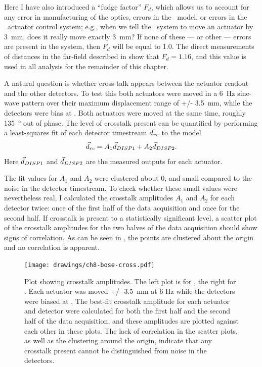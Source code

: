 Here I have also introduced a ``fudge factor'' $F_d$, which allows us to account for any error in manufacturing of the optics, errors in the \ZEMAX\ model, or errors in the \BOSE\ actuator control system; e.g., when we tell the \BOSE\ system to move an actuator by \SI{3}{\mm}, does it really move exactly \SI{3}{\mm}?
If none of these --- or other --- errors are present in the system, then $F_d$ will be equal to 1.0.
The direct measurements of distances in the far-field described in  show that $F_d = 1.16$, and this value is used in all analysis for the remainder of this chapter.


A natural question is whether cross-talk appears between the actuator readout and the other detectors.
To test this both actuators were moved in a \SI{6}{\Hz} sine-wave pattern over their maximum displacement range of +/- 3.5~mm, while the detectors were bias at \SOC.
Both actuators were moved at the same time, roughly \SI{135}{\degree} out of phase.
The level of crosstalk present can be quantified by performing a least-squares fit of each detector timestream $\vec{d}_{rc}$ to the model
\begin{equation}
	 \vec{d}_{rc} = A_1 \vec{d}_{{\small DISP{1}}} + A_2 \vec{d}_{{\small DISP{2}}}.
\end{equation}
Here $\vec{d}_{{\small DISP{1}}}$ and $\vec{d}_{{\small DISP{2}}}$ are the measured outputs for each actuator.

The fit values for $A_1$ and $A_2$ were clustered about 0, and small compared to the noise in the detector timestream.
To check whether these small values were nevertheless real, I calculated the crosstalk amplitudes $A_1$ and $A_2$ for each detector twice: once of the first half of the data acquisition and once for the second half.
If crosstalk is present to a statistically significant level, a scatter plot of the crosstalk amplitudes for the two halves of the data acquisition should show signs of correlation.
As can be seen in , the points are clustered about the origin and no correlation is apparent.

\begin{figure}[th]
\centering
\texttt{[image: drawings/ch8-bose-cross.pdf]}
\caption{
Plot showing crosstalk amplitudes.
The left plot is for , the right for .
Each actuator was moved +/- \SI{3.5}{\mm} at 6 Hz while the detectors were biased at \SOC.
The best-fit crosstalk amplitude for each actuator and detector were calculated for both the first half and the second half of the data acquisition, and these amplitudes are plotted against each other in these plots.
The lack of correlation in the scatter plots, as well as the clustering around the origin, indicate that any crosstalk present cannot be distinguished from noise in the detectors.
}
\label{fig:ch8-bose-cross}
\end{figure}

